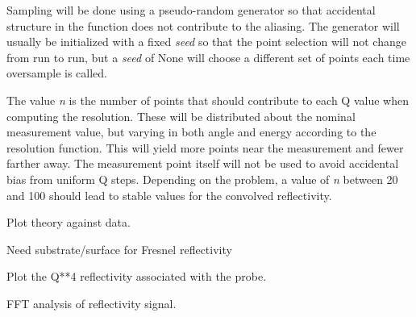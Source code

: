 \documentclass[letterpaper,10pt,english]{sphinxmanual}
\begin{document}
\begin{fulllineitems}
\begin{fulllineitems}
Sampling will be done using a pseudo-random generator so that
accidental structure in the function does not contribute to the
aliasing.  The generator will usually be initialized with a fixed
\emph{seed} so that the point selection will not change from run to run,
but a \emph{seed} of None will choose a different set of points each time
oversample is called.

The value \emph{n} is the number of points that should contribute to
each Q value when computing the resolution.   These will be
distributed about the nominal measurement value, but varying in
both angle and energy according to the resolution function.  This
will yield more points near the measurement and fewer farther away.
The measurement point itself will not be used to avoid accidental
bias from uniform Q steps.  Depending on the problem, a value of
\emph{n} between 20 and 100 should lead to stable values for the convolved
reflectivity.

\end{fulllineitems}


\begin{fulllineitems}
\label{api/probe:refl1d.probe.ProbeSet.parameters}
\end{fulllineitems}


\begin{fulllineitems}
\label{api/probe:refl1d.probe.ProbeSet.plot}
Plot theory against data.

Need substrate/surface for Fresnel reflectivity

\end{fulllineitems}


\begin{fulllineitems}
\label{api/probe:refl1d.probe.ProbeSet.plot_Q4}
Plot the Q**4 reflectivity associated with the probe.

\end{fulllineitems}


\begin{fulllineitems}
\label{api/probe:refl1d.probe.ProbeSet.plot_fft}
FFT analysis of reflectivity signal.


\end{fulllineitems}
\end{fulllineitems}
\end{document}
